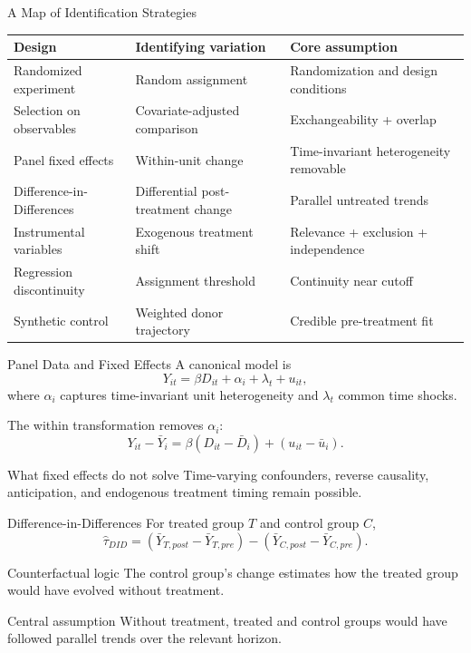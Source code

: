 \documentclass[aspectratio=169,11pt]{beamer}
\begin{document}
\begin{frame}{A Map of Identification Strategies}
\small
\begin{tabular}{p{2.9cm}p{4.1cm}p{5.2cm}}
\toprule
\textbf{Design} & \textbf{Identifying variation} & \textbf{Core assumption} \\
\midrule
Randomized experiment & Random assignment & Randomization and design conditions \\
Selection on observables & Covariate-adjusted comparison & Exchangeability + overlap \\
Panel fixed effects & Within-unit change & Time-invariant heterogeneity removable \\
Difference-in-Differences & Differential post-treatment change & Parallel untreated trends \\
Instrumental variables & Exogenous treatment shift & Relevance + exclusion + independence \\
Regression discontinuity & Assignment threshold & Continuity near cutoff \\
Synthetic control & Weighted donor trajectory & Credible pre-treatment fit \\
\bottomrule
\end{tabular}
\end{frame}

\begin{frame}{Panel Data and Fixed Effects}
A canonical model is
\[
Y_{it}=\beta D_{it}+\alpha_i+\lambda_t+u_{it},
\]
where \(\alpha_i\) captures time-invariant unit heterogeneity and \(\lambda_t\) common time shocks.

The within transformation removes \(\alpha_i\):
\[
Y_{it}-\bar{Y}_i
=
\beta(D_{it}-\bar{D}_i)
+
(u_{it}-\bar{u}_i).
\]

\begin{alertblock}{What fixed effects do not solve}
Time-varying confounders, reverse causality, anticipation, and endogenous treatment timing remain possible.
\end{alertblock}
\end{frame}

\begin{frame}{Difference-in-Differences}
For treated group \(T\) and control group \(C\),
\[
\widehat{\tau}_{DID}
=
(\bar{Y}_{T,post}-\bar{Y}_{T,pre})
-
(\bar{Y}_{C,post}-\bar{Y}_{C,pre}).
\]

\begin{block}{Counterfactual logic}
The control group's change estimates how the treated group would have evolved without treatment.
\end{block}

\begin{alertblock}{Central assumption}
Without treatment, treated and control groups would have followed parallel trends over the relevant horizon.
\end{alertblock}
\end{frame}
\end{document}
